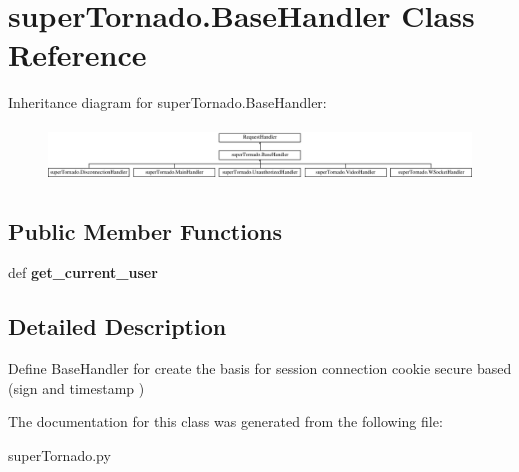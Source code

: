 \hypertarget{classsuper_tornado_1_1_base_handler}{\section{super\-Tornado.\-Base\-Handler Class Reference}
\label{classsuper_tornado_1_1_base_handler}
}
Inheritance diagram for super\-Tornado.\-Base\-Handler\-:\begin{figure}[H]
\begin{center}
\leavevmode
\includegraphics[height=1.473684cm]{classsuper_tornado_1_1_base_handler}
\end{center}
\end{figure}
\subsection*{Public Member Functions}
\begin{DoxyCompactItemize}
\item 
\hypertarget{classsuper_tornado_1_1_base_handler_aecb8cb2cc891c1012986d266958b981d}{def {\bfseries get\-\_\-current\-\_\-user}}\label{classsuper_tornado_1_1_base_handler_aecb8cb2cc891c1012986d266958b981d}

\end{DoxyCompactItemize}


\subsection{Detailed Description}
\begin{DoxyVerb}Define BaseHandler for create the basis for session connection
cookie secure  based (sign and timestamp )
\end{DoxyVerb}
 

The documentation for this class was generated from the following file\-:\begin{DoxyCompactItemize}
\item 
super\-Tornado.\-py\end{DoxyCompactItemize}
